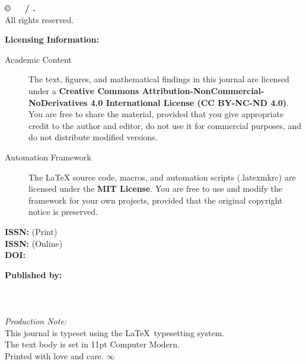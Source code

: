 \begin{flushleft}
  \small
  \setlength{\parskip}{1em}

  \textbf{\copyright\ \docyear\ \doceditor\ / \docpublisher.} \\
  All rights reserved.

  \textbf{Licensing Information:}
  
  {
    \vspace{-0.5cm}
    \footnotesize
    \begin{description}
      \item[Academic Content] The text, figures, and mathematical findings in this journal are licensed under a \textbf{Creative Commons Attribution-NonCommercial-NoDerivatives 4.0 International License (CC BY-NC-ND 4.0)}. You are free to share the material, provided that you give appropriate credit to the author and editor, do not use it for commercial purposes, and do not distribute modified versions.
      \item[Automation Framework] The LaTeX source code, macros, and automation scripts (.latexmkrc) are licensed under the \textbf{MIT License}. You are free to use and modify the framework for your own projects, provided that the original copyright notice is preserved. 
    \end{description}
  }

  \textbf{ISSN:} \texttt{\docissnprint} (Print) \\
  \textbf{ISSN:} \texttt{\docissnonline} (Online) \\
  \textbf{DOI:} 

  \textbf{Published by:} \\
  \docpublisher \\
  \docpublisheraddress \\
  \urlOrig{\docpublisherwebsite} \\

  \vspace{2em}
  \textit{Production Note:} \\
  This journal is typeset using the \LaTeX\ typesetting system. \\
  The text body is set in 11pt Computer Modern. \\
  Printed with love and care. $\infty$
\end{flushleft}
